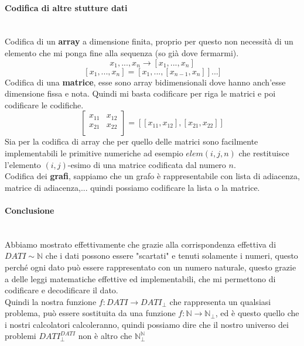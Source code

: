 \documentclass{article}
\begin{document}
\paragraph{Codifica di altre stutture dati}\mbox{}\\
Codifica di un \textbf{array} a dimensione finita, proprio per questo non necessità di
un elemento che mi ponga fine alla sequenza (so già dove fermarmi).
$$x_1,...,x_n\rightarrow[x_1,...,x_n]$$
$$[x_1,...,x_n]=[x_1,...,[x_{n-1},x_n]]...]$$
Codifica di una \textbf{matrice}, esse sono array bidimensionali dove hanno anch'esse
dimensione fissa e nota. Quindi mi basta codificare per riga le matrici e poi codificare
le codifiche.
\[
    \begin{bmatrix}
        x_{11} & x_{12} \\
        x_{21} & x_{22} \\
    \end{bmatrix}
    =\left[[x_{11},x_{12}],[x_{21},x_{22}]\right]
\]
Sia per la codifica di array che per quello delle matrici sono facilmente implementabili
le primitive numeriche ad esempio $elem(i,j,n)$ che restituisce l'elemento $(i,j)$-esimo
di una matrice codificata dal numero $n$.\\Codifica dei \textbf{grafi}, sappiamo
che un grafo è rappresentabile con lista di adiacenza, matrice di adiacenza,...
quindi possiamo codificare la lista o la matrice.
\paragraph{Conclusione}\mbox{}\\
Abbiamo mostrato effettivamente che grazie alla
corrispondenza effettiva di $DATI\sim\mathbb{N}$ che i dati possono essere "scartati" e tenuti solamente i
numeri, questo perché ogni dato può essere rappresentato con un numero naturale, questo
grazie a delle leggi matematiche effettive ed implementabili, che mi
permettono di codificare e decodificare il dato.\\Quindi la nostra funzione $f:DATI\rightarrow DATI_{\bot}$
che rappresenta un qualsiasi problema, può essere sostituita da una funzione $f:\mathbb{N}\rightarrow\mathbb{N}_\bot$,
ed è questo quello che i nostri calcolatori calcoleranno, quindi possiamo dire che il nostro universo
dei problemi $DATI^{DATI}_\bot$ non è altro che $\mathbb{N}^{\mathbb{N}}_\bot$
\end{document}
